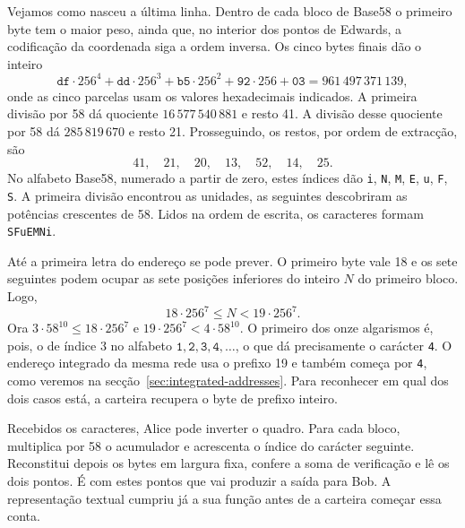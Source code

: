 Vejamos como nasceu a última linha. Dentro de cada bloco de Base58
o primeiro byte tem o maior peso, ainda que, no interior dos pontos
de Edwards, a codificação da coordenada siga a ordem inversa. Os
cinco bytes finais dão o inteiro
\[
 \texttt{df}\cdot256^4+\texttt{dd}\cdot256^3+
 \texttt{b5}\cdot256^2+\texttt{92}\cdot256+\texttt{03}
   =961\,497\,371\,139 ,
\]
onde as cinco parcelas usam os valores hexadecimais indicados. A
primeira divisão por 58 dá quociente \(16\,577\,540\,881\) e resto
41. A divisão desse quociente por 58 dá \(285\,819\,670\) e resto
21. Prosseguindo, os restos, por ordem de extracção, são
\[
                  41,\quad21,\quad20,\quad13,\quad52,\quad14,\quad25 .
\]
No alfabeto Base58, numerado a partir de zero, estes índices dão
\texttt{i}, \texttt{N}, \texttt{M}, \texttt{E}, \texttt{u},
\texttt{F}, \texttt{S}. A primeira divisão encontrou as unidades,
as seguintes descobriram as potências crescentes de 58. Lidos na
ordem de escrita, os caracteres formam \texttt{SFuEMNi}.

Até a primeira letra do endereço se pode prever. O primeiro byte
vale 18 e os sete seguintes podem ocupar as sete posições
inferiores do inteiro \(N\) do primeiro bloco. Logo,
\[
                18\cdot256^7\leq N<19\cdot256^7 .
\]
Ora \(3\cdot58^{10}\leq18\cdot256^7\) e
\(19\cdot256^7<4\cdot58^{10}\). O primeiro dos onze algarismos é,
pois, o de índice 3 no alfabeto
\(\texttt{1},\texttt{2},\texttt{3},\texttt{4},\ldots\), o que
dá precisamente o carácter \texttt{4}. O endereço integrado da mesma
rede usa o prefixo 19 e também começa por \texttt{4}, como veremos
na secção~\ref{sec:integrated-addresses}. Para reconhecer em qual
dos dois casos está, a carteira recupera o byte de prefixo inteiro.

Recebidos os caracteres, Alice pode inverter o quadro. Para cada
bloco, multiplica por 58 o acumulador e acrescenta o índice do
carácter seguinte. Reconstitui depois os bytes em largura fixa,
confere a soma de verificação e lê os dois pontos. É com estes
pontos que vai produzir a saída para Bob. A representação textual
cumpriu já a sua função antes de a carteira começar essa conta.
